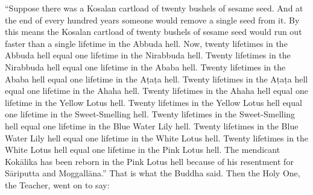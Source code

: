 \documentclass[12pt,openany]{book}%
\begin{document}
“Suppose there was a Kosalan cartload of twenty bushels of sesame seed. And at the end of every hundred years someone would remove a single seed from it. By this means the Kosalan cartload of twenty bushels of sesame seed would run out faster than a single lifetime in the Abbuda hell. Now, twenty lifetimes in the Abbuda hell equal one lifetime in the Nirabbuda hell. Twenty lifetimes in the Nirabbuda hell equal one lifetime in the Ababa hell. Twenty lifetimes in the Ababa hell equal one lifetime in the \textsanskrit{Aṭaṭa} hell. Twenty lifetimes in the \textsanskrit{Aṭaṭa} hell equal one lifetime in the Ahaha hell. Twenty lifetimes in the Ahaha hell equal one lifetime in the Yellow Lotus hell. Twenty lifetimes in the Yellow Lotus hell equal one lifetime in the Sweet-Smelling hell. Twenty lifetimes in the Sweet-Smelling hell equal one lifetime in the Blue Water Lily hell. Twenty lifetimes in the Blue Water Lily hell equal one lifetime in the White Lotus hell. Twenty lifetimes in the White Lotus hell equal one lifetime in the Pink Lotus hell. The mendicant \textsanskrit{Kokālika} has been reborn in the Pink Lotus hell because of his resentment for \textsanskrit{Sāriputta} and \textsanskrit{Moggallāna}.” That is what the Buddha said. Then the Holy One, the Teacher, went on to say: 
\end{document}
